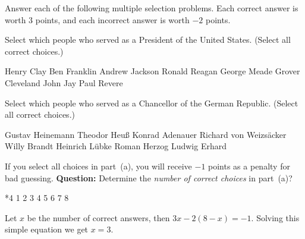 \multipartquestion

    \item{} Answer each of the following multiple
        selection problems. Each correct answer is worth $3$
        points, and each incorrect answer is worth $-2$ points.
    \begin{questions}


\rowsep{3pt}

        \item{} Select which people who served as a President
                     of the United States. (Select all correct choices.)

        \begin{manswers}{2}%
            \bChoices
                 Henry Clay\eAns
                 Ben Franklin\eAns
                \label{aj} Andrew Jackson\eAns
                \label{rr} Ronald Reagan\eAns
                 George Meade\eAns
                \label{gc} Grover Cleveland\eAns
                 John Jay\eAns
                 Paul Revere\eAns
            \eChoices
        \end{manswers}


\rowsep{3pt}

        \item{} Select which people who served as a Chancellor of the
            German Republic. (Select all correct choices.)
        \begin{manswers}{2}%
            \bChoices[2]
                 Gustav Heinemann\eAns
                 Theodor Heu{\ss}\eAns
                 Konrad Adenauer\eAns
                 Richard von Weizs\"{a}cker\eAns
                 Willy Brandt\eAns
                 Heinrich L\"{u}bke\eAns
                 Roman Herzog\eAns
                 Ludwig Erhard\eAns
            \eChoices
        \end{manswers}

\rowsep{3pt}

      \item{} If you select all choices in part~(a), you will
          receive $-1$ points as a penalty for bad guessing. \textbf{Question:}
          Determine the \emph{number of correct choices} in part~(a)?
          \begin{answers}*{4}
          \bChoices
             1\eAns
             2\eAns
             3\eAns
             4\eAns
             5\eAns
             6\eAns
             7\eAns
             8\eAns
          \eChoices
          \end{answers}
\begin{solution}
Let $x$ be the number of correct answers, then $ 3x - 2(8-x) = -1 $. Solving this simple
equation we get $ x = 3 $.
\end{solution}
    \end{questions}
